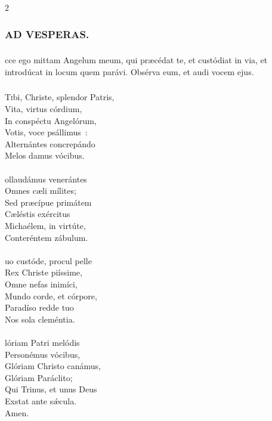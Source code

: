\documentclass[9pt,twoside]{extarticle}
\begin{document}
\begin{multicols}{2}
{\subsubsection*{\center {}}


\subsubsection*{\center \textsc{AD VESPERAS.}}
\subsubsection*{}
cce ego mittam Angelum meum, qui præcédat te, et custódiat in via, et introdúcat in locum quem parávi. Obsérva eum, et audi vocem ejus.

\subsubsection*{\center {}}
\lettrine{T}ibi, Christe, splendor Patris,\\
Vita, virtus córdium,\\
In conspéctu Angelórum,\\
Votis, voce psállimus~:\\
Alternántes concrepándo\\
Melos damus vócibus.\\
\\
ollaudámus venerántes\\
Omnes cæli mílites;\\
Sed præcípue primátem\\
Cæléstis exércitus\\
Michaélem, in virtúte,\\
Conteréntem zábulum.\\
\\
uo custóde, procul pelle\\
Rex Christe piíssime,\\
Omne nefas inimíci,\\
Mundo corde, et córpore,\\
Paradíso redde tuo\\
Nos sola cleméntia.\\
\\
lóriam Patri melódis\\
Personémus vócibus,\\
Glóriam Christo canámus,\\
Glóriam Paráclito;\\
Qui Trinus, et unus Deus\\
Exstat ante sǽcula.\\
Amen.

}
\end{multicols}
\end{document}
